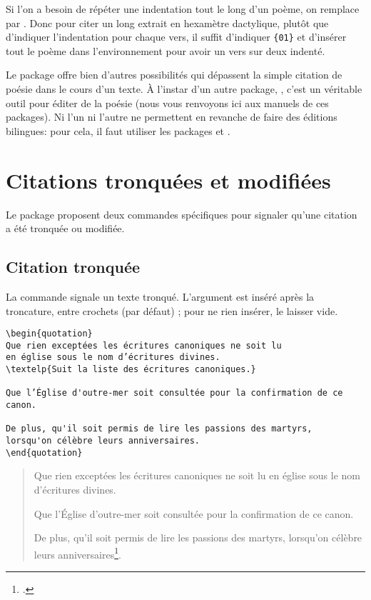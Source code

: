  Si l'on a besoin de répéter une indentation tout le long d'un poème, on remplace  par . Donc pour citer un long extrait en hexamètre dactylique, plutôt que d'indiquer l'indentation pour chaque vers, il suffit  d'indiquer \verb|{01}| et d'insérer tout le poème  dans l'environnement  pour avoir un vers sur deux indenté.
 
 
 Le package  offre bien d'autres possibilités qui dépassent la simple citation de poésie dans le cours d'un texte. À l'instar d'un autre package, , c'est un véritable outil pour éditer de la poésie (nous vous renvoyons ici aux manuels de ces packages). Ni l'un ni l'autre ne permettent en revanche de faire des éditions bilingues: pour cela, il faut utiliser les packages  et . 


\section{Citations tronquées et modifiées}

Le package  proposent deux commandes spécifiques pour signaler qu'une citation a été tronquée ou modifiée.

\subsection{Citation tronquée}

La commande  signale un texte tronqué. L'argument  est inséré après la troncature, entre crochets (par défaut) ; pour ne rien insérer, le laisser vide.

\begin{verbatim}
\begin{quotation}
Que rien exceptées les écritures canoniques ne soit lu
en église sous le nom d’écritures divines.
\textelp{Suit la liste des écritures canoniques.}

Que l’Église d'outre-mer soit consultée pour la confirmation de ce canon.

De plus, qu'il soit permis de lire les passions des martyrs,
lorsqu'on célèbre leurs anniversaires.
\end{quotation}
\end{verbatim}

	\begin{quotation}
	Que rien exceptées les écritures canoniques ne soit lu en église sous le nom d’écritures divines.

Que l’Église d'outre-mer soit consultée pour la confirmation de ce canon.

De plus, qu'il soit permis de lire les passions des martyrs, lorsqu'on célèbre leurs anniversaires\footcite{BreveHippone}.
	\end{quotation}

